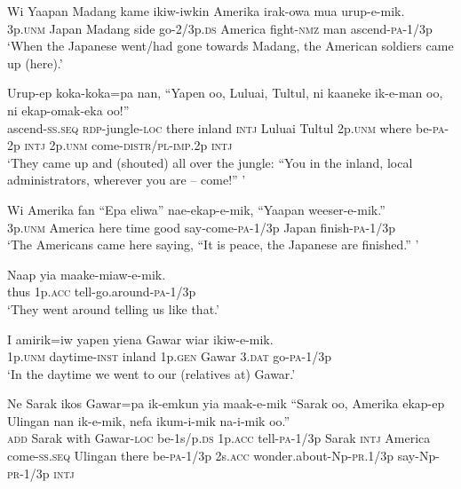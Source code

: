 \ea
\gll  Wi  Yaapan  Madang  kame  ikiw-iwkin  Amerika  irak-owa mua  urup-e-mik. \\
3p.\textsc{unm}  Japan  Madang  side  go-2/3p.\textsc{ds}  America  fight-\textsc{nmz}   man  ascend-\textsc{pa}-1/3p \\


\glt ‘When the Japanese went/had gone towards Madang, the American soldiers came up (here).’ \\
\z


\ea
\gll  Urup-ep  koka-koka=pa  nan,  “Yapen  oo,  Luluai,  Tultul,   ni  kaaneke  ik-e-man  oo,  ni  ekap-omak-eka               oo!” \\
ascend-\textsc{ss.seq}  \textsc{rdp}-jungle-\textsc{loc}  there  inland  \textsc{intj}  Luluai  Tultul 2p.\textsc{unm}  where  be-\textsc{pa}-2p  \textsc{intj}  2p.\textsc{unm}  come-\textsc{distr}/\textsc{pl}-\textsc{imp}.2p \textsc{intj} \\




\glt ‘They came up and (shouted) all over the jungle: “You in the inland, local administrators, wherever you are – come!” ’ \\
\z


\ea
\gll  Wi  Amerika  fan  “Epa  eliwa”  nae-ekap-e-mik,  “Yaapan  weeser-e-mik.” \\
3p.\textsc{unm}  America  here  time  good  say-come-\textsc{pa}-1/3p    Japan  finish-\textsc{pa}-1/3p \\


\glt ‘The Americans came here saying, “It is peace, the Japanese are finished.” ’ \\
\z


\ea
\gll  Naap  yia  maake-miaw-e-mik. \\
thus  1p.\textsc{acc}  tell-go.around-\textsc{pa}-1/3p \\
\glt ‘They went around telling us like that.’ \\
\z


\ea
\gll  I  amirik=iw  yapen  yiena  Gawar  wiar  ikiw-e-mik. \\
1p.\textsc{unm}  daytime-\textsc{inst}  inland  1p.\textsc{gen}  Gawar  3.\textsc{dat}  go-\textsc{pa}-1/3p \\


\glt ‘In the daytime we went to our (relatives at) Gawar.’ \\
\z


\ea
\gll  Ne  Sarak  ikos  Gawar=pa  ik-emkun  yia  maak-e-mik     “Sarak  oo,  Amerika  ekap-ep  Ulingan  nan  ik-e-mik,           nefa  ikum-i-mik  na-i-mik  oo.” \\
\textsc{add}  Sarak  with  Gawar-\textsc{loc}  be-1s/p.\textsc{ds}  1p.\textsc{acc}  tell-\textsc{pa}-1/3p  Sarak  \textsc{intj}  America  come-\textsc{ss.seq}  Ulingan  there  be-\textsc{pa}-1/3p    2s.\textsc{acc}  wonder.about-Np-\textsc{pr}.1/3p  say-Np-\textsc{pr}-1/3p  \textsc{intj} \\




